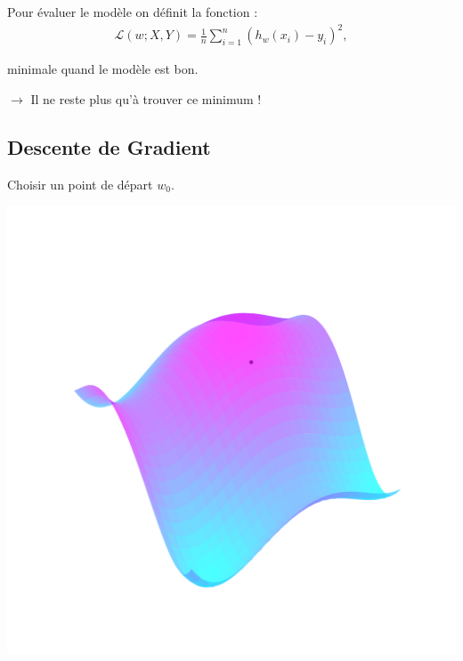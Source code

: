 \documentclass[notheorems]{beamer}
\begin{document}
\begin{frame}
  Pour évaluer le modèle on définit la fonction :
  \begin{align}
    \mathcal L(w; X, Y) = \frac 1 n \sum_{i=1}^n (h_w(x_i) - y_i)^2,
  \end{align}

  minimale quand le modèle est bon.

  \vspace{1em}

  $\longrightarrow$ Il ne reste plus qu'à trouver ce minimum !
\end{frame}

\subsection{Descente de Gradient}
\begin{frame}
  \centering
  \vspace{1.7em}
  Choisir un point de départ $w_0$.

  \vspace{-3.37em}

  \includegraphics[width=0.8\linewidth]{images/gd_1.pdf}
\end{frame}
\addtocounter{framenumber}{-1}
\end{document}
